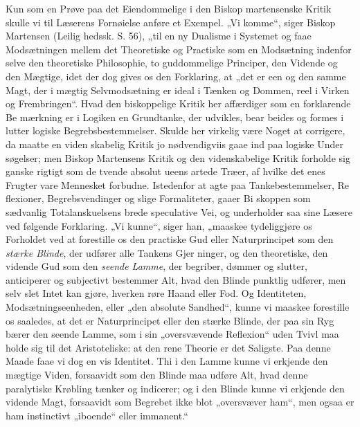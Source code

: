 \documentclass[12pt]{book}
\newcommand{\opage}[1]{\marginnote{\footnotesize\textit{[#1]}}}
\begin{document}
Kun som en Prøve paa det Eiendommelige i den Biskop\-%
martensenske Kritik skulle vi til Læserens Fornøielse anføre
et Exempel. „Vi komme“, siger Biskop Martensen (Leilig\-%
hedssk. S. 56), „til en ny Dualisme i Systemet og faae
Modsætningen mellem det Theoretiske og Practiske som en
Modsætning indenfor selve den theoretiske Philosophie, to
guddommelige Principer, den Vidende og den Mægtige, idet
der dog gives os den Forklaring, at „det er een og den samme
Magt, der i mægtig Selvmodsætning er ideal i Tænken og
Dommen, reel i Virken og Frembringen“. Hvad den
biskoppelige Kritik her affærdiger som en forklarende Be\-%
mærkning er i Logiken en Grundtanke, der udvikles, bear\-%
beides og formes i lutter logiske Begrebsbestemmelser. Skulde
her virkelig være Noget at corrigere, da maatte en viden\-%
skabelig Kritik jo nødvendigviis gaae ind paa logiske Under\-%
søgelser; men Biskop Martensens Kritik og den videnskabelige
Kritik forholde sig ganske rigtigt som de tvende absolut ueens\-%
\opage{132}\setcounter{footnote}{0}%
artede Træer, af hvilke det enes Frugter vare Mennesket
forbudne. Istedenfor at agte paa Tankebestemmelser, Re\-%
flexioner, Begrebsvendinger og slige Formaliteter, gaaer Bi\-%
skoppen som sædvanlig Totalanskuelsens brede speculative Vei,
og underholder saa sine Læsere ved følgende Forklaring.
„Vi kunne“, siger han, „maaskee tydeliggjøre os Forholdet
ved at forestille os den practiske Gud eller Naturprincipet
som den \emph{stærke Blinde}, der udfører alle Tankens Gjer\-%
ninger, og den theoretiske, den vidende Gud som den \emph{seende
Lamme}, der begriber, dømmer og slutter, anticiperer og
subjectivt bestemmer Alt, hvad den Blinde punktlig udfører,
men selv slet Intet kan gjøre, hverken røre Haand eller Fod.
Og Identiteten, Modsætningseenheden, eller „den absolute
Sandhed“, kunne vi maaskee forestille os saaledes, at det er
Naturprincipet eller den stærke Blinde, der paa sin Ryg
bærer den seende Lamme, som i sin „oversvævende Reflexion“
uden Tvivl maa holde sig til det Aristoteliske: at den rene
Theorie er det Saligste. Paa denne Maade faae vi dog en
vis Identitet. Thi i den Lamme kunne vi erkjende den
mægtige Viden, forsaavidt som den Blinde maa udføre Alt,
hvad denne paralytiske Krøbling tænker og indicerer; og i
den Blinde kunne vi erkjende den vidende Magt, forsaavidt
som Begrebet ikke blot „oversvæver ham“, men ogsaa er
ham instinctivt „iboende“ eller immanent.“
\end{document}
